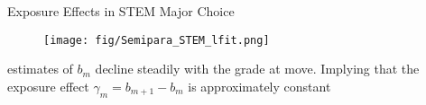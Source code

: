 \documentclass[aspectratio=169,xcolor=dvipsnames]{beamer}
\begin{document}





\begin{frame}{Exposure Effects in STEM Major Choice}\label{semi-para}
 
\begin{figure}[H]
    \centering
    \texttt{[image: fig/Semipara\_STEM\_lfit.png]}
    \end{figure}
estimates of $b_m$ decline steadily with the grade at move. Implying that the exposure effect $\gamma_m = b_{m+1} - b_{m}$ is approximately constant
\hyperlink{symmetry}{} 
\hyperlink{county}{} 
\hyperlink{para}{}
\end{frame}
\end{document}
